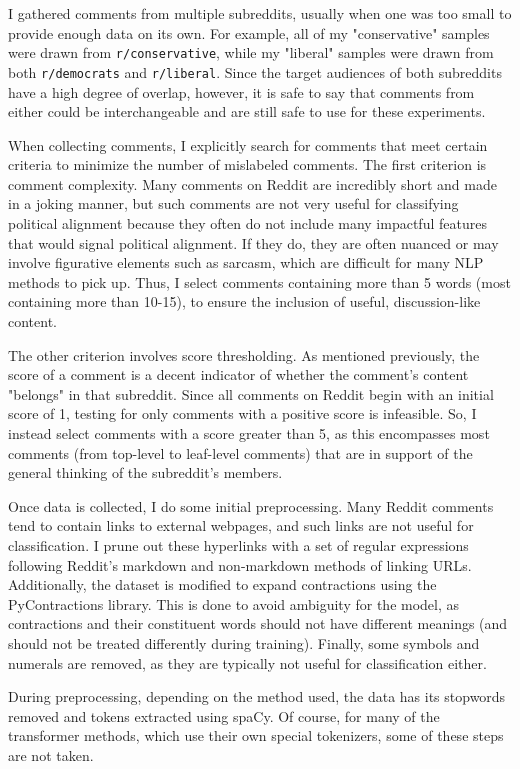 \documentclass[11pt,a4paper]{article}
\begin{document}
I gathered comments from multiple subreddits, usually when one was too small to provide enough data on its own. For example, all of my "conservative" samples were drawn from \texttt{r/conservative}, while my "liberal" samples were drawn from both \texttt{r/democrats} and \texttt{r/liberal}. Since the target audiences of both subreddits have a high degree of overlap, however, it is safe to say that comments from either could be interchangeable and are still safe to use for these experiments.

When collecting comments, I explicitly search for comments that meet certain criteria to minimize the number of mislabeled comments. The first criterion is comment complexity. Many comments on Reddit are incredibly short and made in a joking manner, but such comments are not very useful for classifying political alignment because they often do not include many impactful features that would signal political alignment. If they do, they are often nuanced or may involve figurative elements such as sarcasm, which are difficult for many NLP methods to pick up. Thus, I select comments containing more than 5 words (most containing more than 10-15), to ensure the inclusion of useful, discussion-like content.

The other criterion involves score thresholding. As mentioned previously, the score of a comment is a decent indicator of whether the comment's content "belongs" in that subreddit. Since all comments on Reddit begin with an initial score of 1, testing for only comments with a positive score is infeasible. So, I instead select comments with a score greater than 5, as this encompasses most comments (from top-level to leaf-level comments) that are in support of the general thinking of the subreddit's members.

Once data is collected, I do some initial preprocessing. Many Reddit comments tend to contain links to external webpages, and such links are not useful for classification. I prune out these hyperlinks with a set of regular expressions following Reddit's markdown and non-markdown methods of linking URLs. Additionally, the dataset is modified to expand contractions using the PyContractions library. This is done to avoid ambiguity for the model, as contractions and their constituent words should not have different meanings (and should not be treated differently during training). Finally, some symbols and numerals are removed, as they are typically not useful for classification either.

During preprocessing, depending on the method used, the data has its stopwords removed and tokens extracted using spaCy. Of course, for many of the transformer methods, which use their own special tokenizers, some of these steps are not taken.
\end{document}

